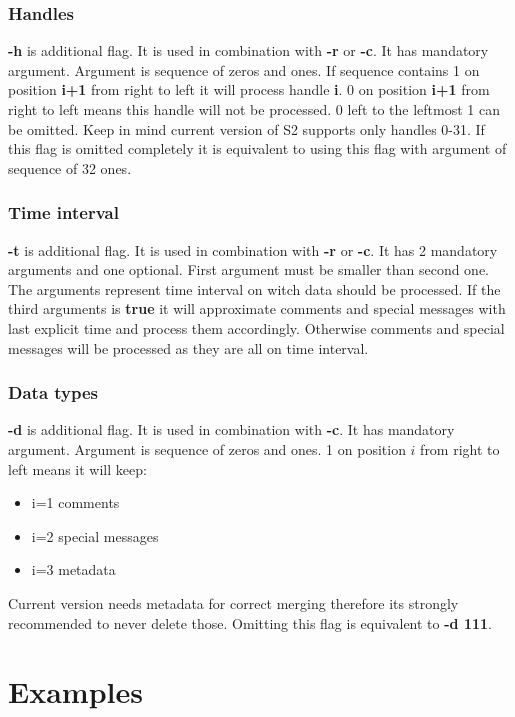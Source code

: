 \documentclass[english]{article}
\begin{document}
\subsubsection{Handles}
 \textbf{-h} is additional flag.  It is used in combination with \textbf{-r} or \textbf{-c}. It has mandatory argument. Argument is sequence of zeros and ones. If sequence contains 1 on position \textbf{i+1} from right to left it will process handle \textbf{i}. 0 on position \textbf{i+1} from right to left means this handle will not be processed. 0 left to the leftmost 1 can be omitted. Keep in mind current version of S2 supports only handles 0-31. If this flag is omitted  completely it is equivalent to using this flag with argument of sequence of 32 ones.

\subsubsection{Time interval}
\textbf{-t} is additional flag. It is used in combination with \textbf{-r} or \textbf{-c}. It has 2 mandatory arguments and one optional. First argument must be smaller than second one. The arguments represent time interval on witch data should be processed. If the third arguments is \textbf{true} it will approximate comments and special messages with last explicit time and process them accordingly. Otherwise comments and special messages will be processed as they are all on time interval. 

\subsubsection{Data types}
\textbf{-d} is additional flag. It is used in combination with \textbf{-c}.  It has mandatory argument. Argument is sequence of zeros and ones. 1 on position $i$ from right to left means it will keep:
 \begin{itemize}
\item i=1 comments
\item i=2 special messages
\item i=3 metadata
\end{itemize}
Current version needs metadata for correct merging therefore its strongly recommended to never delete those.
Omitting this flag is equivalent to \textbf{-d 111}.

\section{Examples}
\end{document}
